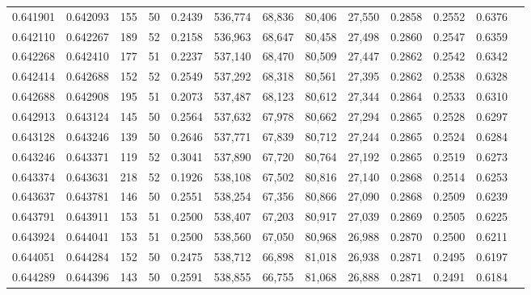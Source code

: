 \begin{tabular}{rrrrrrrrrrrrr}
0.641901 & 0.642093 &   155 &  50 &                                     0.2439 & 536,774 &  68,836 &  80,406 &  27,550 & 0.2858 & 0.2552 & 0.6376 \\
0.642110 & 0.642267 &   189 &  52 &                                     0.2158 & 536,963 &  68,647 &  80,458 &  27,498 & 0.2860 & 0.2547 & 0.6359 \\
0.642268 & 0.642410 &   177 &  51 &                                     0.2237 & 537,140 &  68,470 &  80,509 &  27,447 & 0.2862 & 0.2542 & 0.6342 \\
0.642414 & 0.642688 &   152 &  52 &                                     0.2549 & 537,292 &  68,318 &  80,561 &  27,395 & 0.2862 & 0.2538 & 0.6328 \\
0.642688 & 0.642908 &   195 &  51 &                                     0.2073 & 537,487 &  68,123 &  80,612 &  27,344 & 0.2864 & 0.2533 & 0.6310 \\
0.642913 & 0.643124 &   145 &  50 &                                     0.2564 & 537,632 &  67,978 &  80,662 &  27,294 & 0.2865 & 0.2528 & 0.6297 \\
0.643128 & 0.643246 &   139 &  50 &                                     0.2646 & 537,771 &  67,839 &  80,712 &  27,244 & 0.2865 & 0.2524 & 0.6284 \\
0.643246 & 0.643371 &   119 &  52 &                                     0.3041 & 537,890 &  67,720 &  80,764 &  27,192 & 0.2865 & 0.2519 & 0.6273 \\
0.643374 & 0.643631 &   218 &  52 &                                     0.1926 & 538,108 &  67,502 &  80,816 &  27,140 & 0.2868 & 0.2514 & 0.6253 \\
0.643637 & 0.643781 &   146 &  50 &                                     0.2551 & 538,254 &  67,356 &  80,866 &  27,090 & 0.2868 & 0.2509 & 0.6239 \\
0.643791 & 0.643911 &   153 &  51 &                                     0.2500 & 538,407 &  67,203 &  80,917 &  27,039 & 0.2869 & 0.2505 & 0.6225 \\
0.643924 & 0.644041 &   153 &  51 &                                     0.2500 & 538,560 &  67,050 &  80,968 &  26,988 & 0.2870 & 0.2500 & 0.6211 \\
0.644051 & 0.644284 &   152 &  50 &                                     0.2475 & 538,712 &  66,898 &  81,018 &  26,938 & 0.2871 & 0.2495 & 0.6197 \\
0.644289 & 0.644396 &   143 &  50 &                                     0.2591 & 538,855 &  66,755 &  81,068 &  26,888 & 0.2871 & 0.2491 & 0.6184 \\

\end{tabular}
